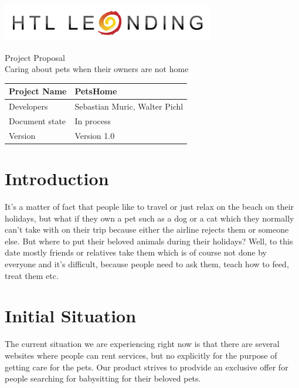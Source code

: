 \documentclass[12pt]{article}
\theoremstyle{definition}
\newenvironment{explanation}{%
}{}
\newcommand{\projectname}{PetsHome}
\newcommand{\productname}{Caring about pets when their owners are not home}
\newcommand{\developers}{Sebastian Muric, Walter Pichl}
\newcommand{\documentstatus}{In process}
\newcommand{\version}{Version 1.0}
\begin{document}
\begin{titlepage}
\begin{flushright}
\includegraphics[scale=.5]{htlleondinglogo.png}\\
\end{flushright}

\vspace{10em}

\begin{center}
{\Huge Project Proposal} \\[3em]
{\LARGE \productname} \\[3em]
\end{center}

\begin{flushleft}
\begin{tabular}{|l|l|}
\hline
Project Name & \projectname \\ \hline
Developers & \developers \\ \hline
Document state & \documentstatus \\ \hline
Version & \version \\ \hline
\end{tabular}
\end{flushleft}

\end{titlepage}
\pagebreak

\tableofcontents
\pagebreak

\section{Introduction}
\begin{explanation}
It's a matter of fact that people like to travel or just relax on the beach on their holidays, but what if they own a pet such as a dog or a cat which they normally can't take with on their trip because either the airline rejects them or someone else.
But where to put their beloved animals during their holidays? Well, to this date mostly friends or relatives take them which is of course not done by everyone and it's difficult, because people need to ask them, teach how to feed, treat them etc.
\end{explanation}

\section{Initial Situation}
\begin{explanation}
The current situation we are experiencing right now is that there are several websites where people can rent services, but no explicitly for the purpose of getting care for the pets.
Our product strives to prodvide an exclusive offer for people searching for babysitting for their beloved pets.
\end{explanation}
\end{document}
